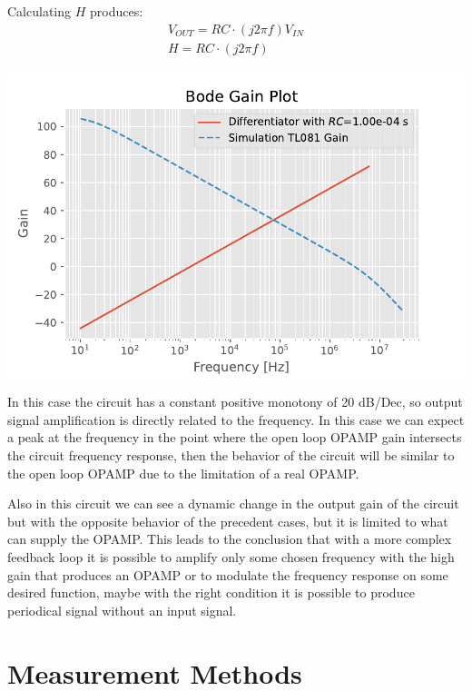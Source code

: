 \documentclass[a4paper, twocolumn]{article}
\begin{document}
Calculating \(H\) produces:
\begin{gather}
    V_{OUT}=RC\cdot(j2\pi f)V_{IN}\\
    H = RC\cdot(j2\pi f)
\end{gather}

\begin{center}
    \includegraphics[width=\columnwidth]{def_graph/DifferentiatorBodeTheo.pdf}
    \label{fig:DiffBodeGraphTheo}
\end{center}

In this case the circuit has a constant positive monotony of 20 dB/Dec, so output signal amplification is directly related to the frequency. In this case we can expect a peak at the frequency in the point where the open loop OPAMP gain intersects the circuit frequency response, then the behavior of the circuit will be similar to the open loop OPAMP due to the limitation of a real OPAMP.

Also in this circuit we can see a dynamic change in the output gain of the circuit but with the opposite behavior of the precedent cases, but it is limited to what can supply the OPAMP. This leads to the conclusion that with a more complex feedback loop it is possible to amplify only some chosen frequency with the high gain that produces an OPAMP or to modulate the frequency response on some desired function, maybe with the right condition it is possible to produce periodical signal without an input signal.

\section{Measurement Methods}

\end{document}
